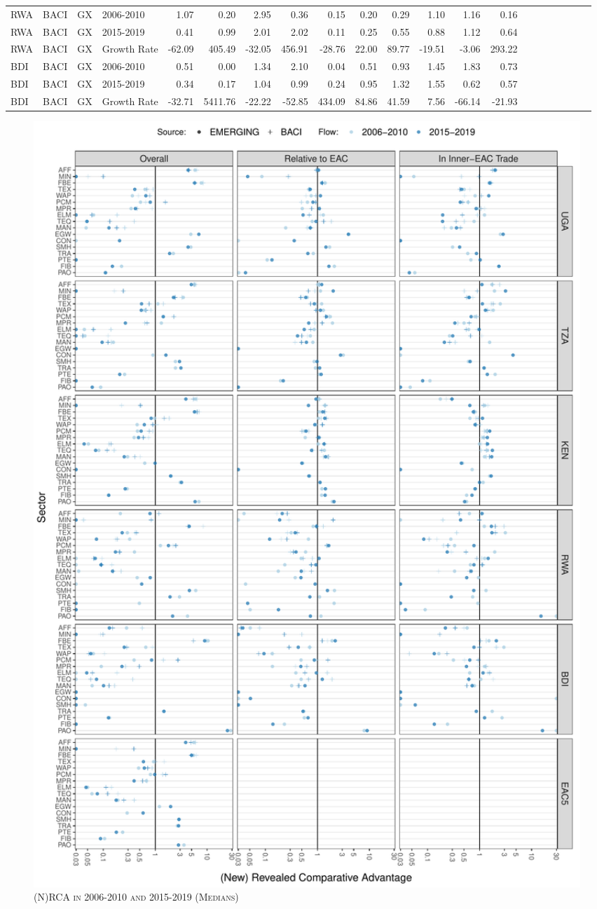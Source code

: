 \documentclass[a4paper]{article}
\begin{document}
\begin{table}[ht]
{\begin{tabular}{llllrrrrrrrrrrrrrrrrr}
  RWA & BACI & GX & 2006-2010 & 1.07 & 0.20 & 2.95 & 0.36 & 0.15 & 0.20 & 0.29 & 1.10 & 1.16 & 0.16 &  &  &  &  &  &  &  \\ 
  RWA & BACI & GX & 2015-2019 & 0.41 & 0.99 & 2.01 & 2.02 & 0.11 & 0.25 & 0.55 & 0.88 & 1.12 & 0.64 &  &  &  &  &  &  &  \\ 
  RWA & BACI & GX & Growth Rate & -62.09 & 405.49 & -32.05 & 456.91 & -28.76 & 22.00 & 89.77 & -19.51 & -3.06 & 293.22 &  &  &  &  &  &  &  \\ 
  BDI & BACI & GX & 2006-2010 & 0.51 & 0.00 & 1.34 & 2.10 & 0.04 & 0.51 & 0.93 & 1.45 & 1.83 & 0.73 &  &  &  &  &  &  &  \\ 
  BDI & BACI & GX & 2015-2019 & 0.34 & 0.17 & 1.04 & 0.99 & 0.24 & 0.95 & 1.32 & 1.55 & 0.62 & 0.57 &  &  &  &  &  &  &  \\ 
  BDI & BACI & GX & Growth Rate & -32.71 & 5411.76 & -22.22 & -52.85 & 434.09 & 84.86 & 41.59 & 7.56 & -66.14 & -21.93 &  &  &  &  &  &  &  \\ \bottomrule
\end{tabular}
}
\end{table}


\begin{figure}[h!]
\centering
\caption{\label{fig:NRCA_Diff}\textsc{(N)RCA in 2006-2010 and 2015-2019 (Medians)}}
\includegraphics[width=1\textwidth]{"Figures/NRCA_EAC5_DIFF_ALL.pdf"} \end{figure}
\FloatBarrier
\end{document}
